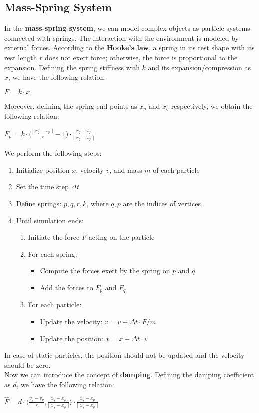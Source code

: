 \documentclass{article}
\begin{document}
\subsection{Mass-Spring System}
In the \textbf{mass-spring system}, we can model complex objects as particle systems connected with springs. The interaction with the environment is modeled by external forces. According to the \textbf{Hooke's law}, a spring in its rest shape with its rest length $r$ does not exert force; otherwise, the force is proportional to the expansion. Defining the spring stiffness with $k$ and its expansion/compression as $x$, we have the following relation:
\begin{center}
    $F = k \cdot x$
\end{center}
Moreover, defining the spring end points as $x_p$ and $x_q$ respectively, we obtain the following relation:
\begin{center}
    $F_p = k \cdot \big(\displaystyle\frac{||x_q - x_p||}{r} - 1\big) \cdot \displaystyle\frac{x_q - x_p}{||x_q - x_p||}$
\end{center}
We perform the following steps:
\begin{enumerate}
    \item Initialize position $x$, velocity $v$, and mass $m$ of each particle
    \item Set the time step $\Delta t$
    \item Define springs: $p, q, r, k$, where $q, p$ are the indices of vertices
    \item Until simulation ends:
        \begin{enumerate}
            \item Initiate the force $F$ acting on the particle
            \item For each spring:
                \begin{itemize}
                    \item Compute the forces exert by the spring on $p$ and $q$
                    \item Add the forces to $F_p$ and $F_q$
                \end{itemize}
            \item For each particle:
                \begin{itemize}
                    \item Update the velocity: $v = v + \Delta t \cdot F / m$
                    \item Update the position: $x = x + \Delta t \cdot v$
                \end{itemize}
        \end{enumerate}
\end{enumerate}
In case of static particles, the position should not be updated and the velocity should be zero. \\
Now we can introduce the concept of \textbf{damping}. Defining the damping coefficient as $d$, we have the following relation:
\begin{center}
    $\hat{F} = d \cdot \langle\displaystyle\frac{v_q - v_p}{r}, \displaystyle\frac{x_q - x_p}{||x_q - x_p||}\rangle \cdot \displaystyle\frac{x_q - x_p}{||x_q - x_p||}$
\end{center}
\end{document}

